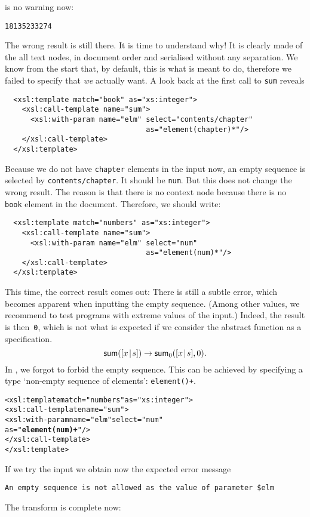 is no warning now:
\begin{verbatim}
18135233274
\end{verbatim}
The wrong result is still there. It is time to understand why! It is
clearly made of the all text nodes, in document order and serialised
without any separation. We know from the start that, by default, this
is what \XSLT is meant to do, therefore we failed to specify that
\emph{we} actually want. A look back at the first call to \texttt{sum}
reveals
\begin{verbatim}
  <xsl:template match="book" as="xs:integer">
    <xsl:call-template name="sum">
      <xsl:with-param name="elm" select="contents/chapter"
                                 as="element(chapter)*"/>
    </xsl:call-template>
  </xsl:template>
\end{verbatim}
Because we do not have \texttt{chapter} elements in the input now, an
empty sequence is selected by \texttt{contents/chapter}. It should be
\texttt{num}. But this does not change the wrong result. The reason is
that there is no context node because there is no \texttt{book}
element in the document. Therefore, we should write:
\begin{verbatim}
  <xsl:template match="numbers" as="xs:integer">
    <xsl:call-template name="sum">
      <xsl:with-param name="elm" select="num"
                                 as="element(num)*"/>
    </xsl:call-template>
  </xsl:template>
\end{verbatim}
This time, the correct result comes out:
\noindent There is still a subtle error, which becomes apparent when
inputting the empty sequence. (Among other values, we recommend to
test programs with extreme values of the input.) Indeed, the result is
then~\texttt{0}, which is not what is expected if we consider the
abstract function  as a specification.
\begin{equation*}
\textsf{sum}([{x}\!\mid\!{s}]) \rightarrow \textsf{sum}_0([{x}\!\mid\!{s}],0).
\end{equation*}
In \XSLT, we forgot to forbid the empty sequence. This can be achieved
by specifying a type `non\hyp{}empty sequence of elements':
\texttt{element()+}.
\begin{alltt}
  <xsl:template match="numbers" as="xs:integer">
    <xsl:call-template name="sum">
      <xsl:with-param name="elm" select="num"
                                 as="\textbf{element(num)+}"/>
    </xsl:call-template>
  </xsl:template>
\end{alltt}
If we try the input
\noindent we obtain now the expected error message
\begin{verbatim}
An empty sequence is not allowed as the value of parameter $elm
\end{verbatim}
The transform is complete now:

